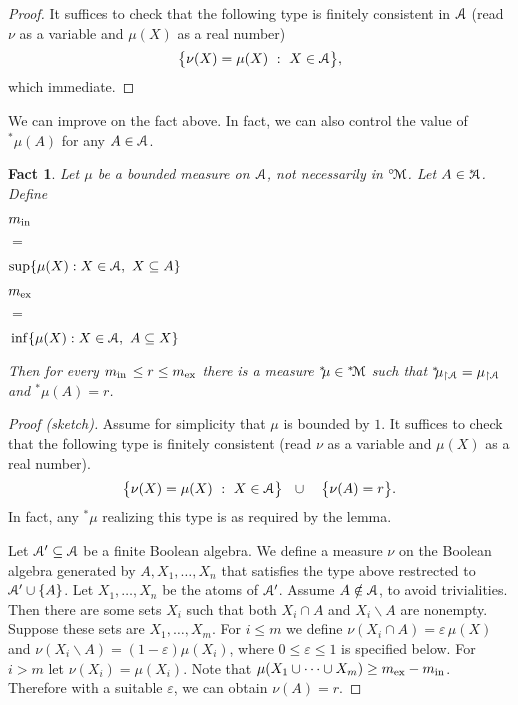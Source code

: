 \documentclass[12pt,letterpaper,oneside,reqno]{amsart}
\theoremstyle{plain}
\newtheorem{fact}[theorem]{Fact}
\theoremstyle{remark}
\begin{document}
\begin{proof}
  It suffices to check that the following type is finitely consistent in ${\EuScript A}$ (read $\nu$ as a variable and $\mu(X)$ as a real number)
  $$
  \big\{\nu(X)=\mu(X) \ :\ X\in{\EuScript A}\big\},
  $$
  which immediate.
\end{proof}

We can improve on the fact above.
In fact, we can also control the value of ${}^{*\!\!}\mu(A)$ for any $A\in{\EuScript A}$.

\def\ceq#1#2#3{\parbox[t]{25ex}{$\displaystyle #1$}\parbox{5ex}{\hfil $#2$}{$\displaystyle #3$}}

\begin{fact}
  Let $\mu$ be a bounded measure on ${\EuScript A}$, not necessarily in ${}^{\circ\!}{\EuScript M}$.
  Let $A\in{}^{*\!\!\!}{\EuScript A}$.
  Define 
  
  \ceq{\hfill m_{\rm in\,}}{=}{\sup\{\mu(X): X\in{\EuScript A},\ X\subseteq A\}}

  \ceq{\hfill m_{\rm ex}}{=}{\,\inf\{\mu(X): X\in{\EuScript A}, \  A\subseteq X \}}

  Then for every $m_{\rm in\,}\le r\le m_{\rm ex}$ there is a measure ${}^{*\!\!}\mu\in{}^{*\!}{\EuScript M}$ such that ${}^{*\!\!}\mu_{\restriction{\EuScript A}}=\mu_{\restriction{\EuScript A}}$ and  ${}^{*\!\!}\mu(A)=r$.
\end{fact}

\begin{proof}[Proof (sketch)]
Assume for simplicity that $\mu$ is bounded by $1$.
It suffices to check that the following type is finitely consistent (read $\nu$ as a variable and $\mu(X)$ as a real number).
$$
\big\{\nu(X)=\mu(X) \ :\ X\in{\EuScript A}\big\}
\ \ \cup\ \ \
\big\{\nu(A)=r\big\}.
$$
In fact, any ${}^{*\!\!}\mu$ realizing this type is as required by the lemma.

Let ${\EuScript A}'\subseteq{\EuScript A}$ be a finite Boolean algebra.
We define a measure $\nu$ on the Boolean algebra generated by $A,X_1,\dots,X_n$ that satisfies the type above restrected to ${\EuScript A}'\cup\{A\}$.
Let $X_1,\dots,X_n$ be the atoms of ${\EuScript A}'$.
Assume $A\notin{\EuScript A}$, to avoid trivialities.
Then there are some sets $X_i$ such that both $X_i\cap A$ and $X_i\smallsetminus A$ are nonempty.
Suppose these sets are $X_1,\dots,X_m$.
For $i\le m$ we define $\nu(X_i\cap A)=\varepsilon\,\mu(X)$ and $\nu(X_i\smallsetminus A)=(1-\varepsilon)\mu(X_i)$, where $0\le\varepsilon\le1$ is specified below.
For $i>m$ let $\nu(X_i)=\mu(X_i)$.
Note that $\mu(X_1\cup\dots\cup X_m)\ge m_{\rm ex}-m_{\rm in}$.
Therefore with a suitable $\varepsilon$, we can obtain $\nu(A)=r$.
\end{proof}
\end{document}
